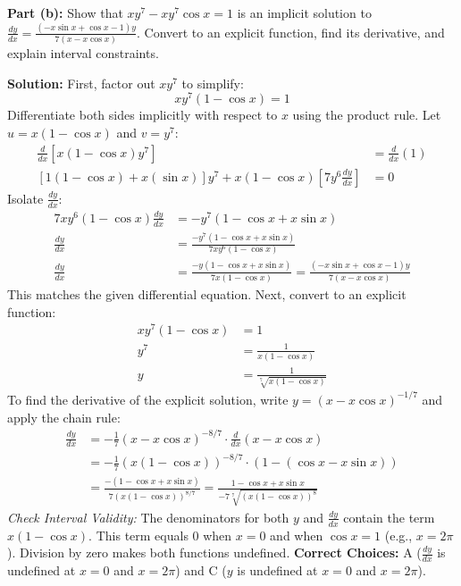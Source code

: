 \documentclass[12pt]{article}
\begin{document}
\textbf{Part (b):} Show that $xy^7 - xy^7\cos x = 1$ is an implicit solution to $\frac{dy}{dx} = \frac{(-x\sin x + \cos x - 1)y}{7(x - x\cos x)}$. Convert to an explicit function, find its derivative, and explain interval constraints.

\textbf{Solution:}
First, factor out $xy^7$ to simplify:
\[ xy^7(1 - \cos x) = 1 \]
Differentiate both sides implicitly with respect to $x$ using the product rule. Let $u = x(1-\cos x)$ and $v = y^7$:
\begin{align*}
    \frac{d}{dx} \left[ x(1-\cos x)y^7 \right] &= \frac{d}{dx}(1) \\
    \left[ 1(1-\cos x) + x(\sin x) \right]y^7 + x(1-\cos x) \left[ 7y^6 \frac{dy}{dx} \right] &= 0
\end{align*}
Isolate $\frac{dy}{dx}$:
\begin{align*}
    7xy^6(1-\cos x) \frac{dy}{dx} &= -y^7 (1 - \cos x + x\sin x) \\
    \frac{dy}{dx} &= \frac{-y^7 (1 - \cos x + x\sin x)}{7xy^6(1-\cos x)} \\
    \frac{dy}{dx} &= \frac{-y (1 - \cos x + x\sin x)}{7x(1-\cos x)} = \frac{(-x\sin x + \cos x - 1)y}{7(x - x\cos x)}
\end{align*}
This matches the given differential equation. Next, convert to an explicit function:
\begin{align*}
    xy^7(1 - \cos x) &= 1 \\
    y^7 &= \frac{1}{x(1 - \cos x)} \\
    y &= \frac{1}{\sqrt[7]{x(1 - \cos x)}}
\end{align*}
To find the derivative of the explicit solution, write $y = (x - x\cos x)^{-1/7}$ and apply the chain rule:
\begin{align*}
    \frac{dy}{dx} &= -\frac{1}{7}(x - x\cos x)^{-8/7} \cdot \frac{d}{dx}(x - x\cos x) \\
    &= -\frac{1}{7}(x(1-\cos x))^{-8/7} \cdot (1 - (\cos x - x\sin x)) \\
    &= \frac{-(1 - \cos x + x\sin x)}{7 (x(1-\cos x))^{8/7}} = \frac{1 - \cos x + x\sin x}{-7\sqrt[7]{(x(1-\cos x))^8}}
\end{align*}
\textit{Check Interval Validity:} The denominators for both $y$ and $\frac{dy}{dx}$ contain the term $x(1-\cos x)$. This term equals $0$ when $x = 0$ and when $\cos x = 1$ (e.g., $x = 2\pi$). Division by zero makes both functions undefined.
\textbf{Correct Choices:} A ($\frac{dy}{dx}$ is undefined at $x=0$ and $x=2\pi$) and C ($y$ is undefined at $x=0$ and $x=2\pi$).
\end{document}
